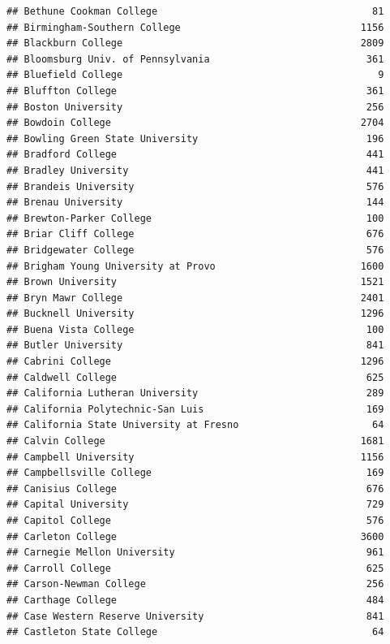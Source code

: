 \documentclass[
]{article}
\begin{document}
\begin{verbatim}
## Bethune Cookman College                                     81
## Birmingham-Southern College                               1156
## Blackburn College                                         2809
## Bloomsburg Univ. of Pennsylvania                           361
## Bluefield College                                            9
## Bluffton College                                           361
## Boston University                                          256
## Bowdoin College                                           2704
## Bowling Green State University                             196
## Bradford College                                           441
## Bradley University                                         441
## Brandeis University                                        576
## Brenau University                                          144
## Brewton-Parker College                                     100
## Briar Cliff College                                        676
## Bridgewater College                                        576
## Brigham Young University at Provo                         1600
## Brown University                                          1521
## Bryn Mawr College                                         2401
## Bucknell University                                       1296
## Buena Vista College                                        100
## Butler University                                          841
## Cabrini College                                           1296
## Caldwell College                                           625
## California Lutheran University                             289
## California Polytechnic-San Luis                            169
## California State University at Fresno                       64
## Calvin College                                            1681
## Campbell University                                       1156
## Campbellsville College                                     169
## Canisius College                                           676
## Capital University                                         729
## Capitol College                                            576
## Carleton College                                          3600
## Carnegie Mellon University                                 961
## Carroll College                                            625
## Carson-Newman College                                      256
## Carthage College                                           484
## Case Western Reserve University                            841
## Castleton State College                                     64

\end{verbatim}
\end{document}

